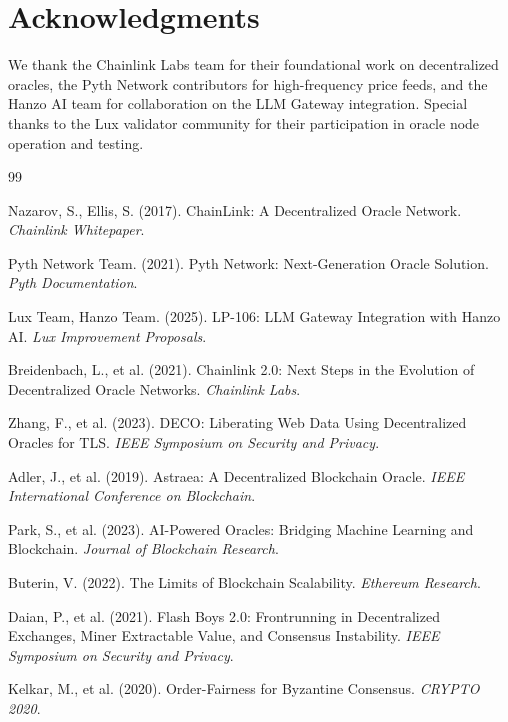 \section*{Acknowledgments}


We thank the Chainlink Labs team for their foundational work on decentralized oracles, the Pyth Network contributors for high-frequency price feeds, and the Hanzo AI team for collaboration on the LLM Gateway integration. Special thanks to the Lux validator community for their participation in oracle node operation and testing.

\begin{thebibliography}{99}

 Nazarov, S., Ellis, S. (2017). ChainLink: A Decentralized Oracle Network. \textit{Chainlink Whitepaper}.

 Pyth Network Team. (2021). Pyth Network: Next-Generation Oracle Solution. \textit{Pyth Documentation}.

 Lux Team, Hanzo Team. (2025). LP-106: LLM Gateway Integration with Hanzo AI. \textit{Lux Improvement Proposals}.

 Breidenbach, L., et al. (2021). Chainlink 2.0: Next Steps in the Evolution of Decentralized Oracle Networks. \textit{Chainlink Labs}.

 Zhang, F., et al. (2023). DECO: Liberating Web Data Using Decentralized Oracles for TLS. \textit{IEEE Symposium on Security and Privacy}.

 Adler, J., et al. (2019). Astraea: A Decentralized Blockchain Oracle. \textit{IEEE International Conference on Blockchain}.

 Park, S., et al. (2023). AI-Powered Oracles: Bridging Machine Learning and Blockchain. \textit{Journal of Blockchain Research}.

 Buterin, V. (2022). The Limits of Blockchain Scalability. \textit{Ethereum Research}.

 Daian, P., et al. (2021). Flash Boys 2.0: Frontrunning in Decentralized Exchanges, Miner Extractable Value, and Consensus Instability. \textit{IEEE Symposium on Security and Privacy}.

 Kelkar, M., et al. (2020). Order-Fairness for Byzantine Consensus. \textit{CRYPTO 2020}.

\end{thebibliography}


